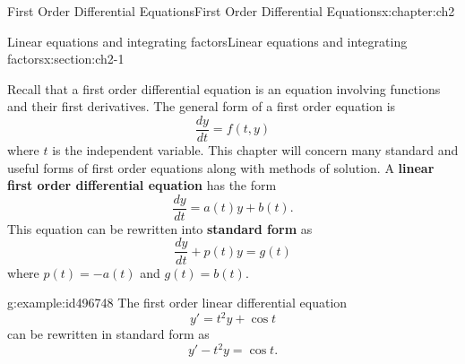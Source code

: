 \documentclass[oneside,10pt,]{book}
\newcommand{\terminology}[1]{\textbf{#1}}
\numberwithin{equation}{section}
\numberwithin{equation}{section}
\begin{document}
\begin{chapterptx}{First Order Differential Equations}{}{First Order Differential Equations}{}{}{x:chapter:ch2}
%
%
\typeout{************************************************}
\typeout{************************************************}
%
\begin{sectionptx}{Linear equations and integrating factors}{}{Linear equations and integrating factors}{}{}{x:section:ch2-1}
\begin{introduction}{}%
Recall that a first order differential equation is an equation involving functions and their first derivatives. The general form of a first order equation is%
\begin{equation*}
\frac{dy}{dt} = f(t, y)
\end{equation*}
where \(t\) is the independent variable. This chapter will concern many standard and useful forms of first order equations along with methods of solution. A \terminology{linear first order differential equation} has the form%
\begin{equation*}
\frac{dy}{dt} = a(t) y + b(t).
\end{equation*}
This equation can be rewritten into \terminology{standard form} as%
\begin{equation*}
\frac{dy}{dt} + p(t) y = g(t)
\end{equation*}
where \(p(t) = -a(t)\) and \(g(t) = b(t)\).%
\begin{example}{}{g:example:id496748}%
The first order linear differential equation%
\begin{equation*}
y' = t^2 y + \cos t
\end{equation*}
can be rewritten in standard form as%
\begin{equation*}
y' - t^2 y = \cos t.
\end{equation*}
%
\end{example}
\end{introduction}%
%
%
\typeout{************************************************}
\typeout{************************************************}
%
\end{sectionptx}
\end{chapterptx}
\end{document}
